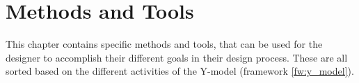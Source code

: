 \chapter{Methods and Tools} \label{chap:methods}
This chapter contains specific methods and tools, that can be used for the designer to accomplish their different goals in their design process. These are all sorted based on the different activities of the Y-model (framework \ref{fw:y_model}).






